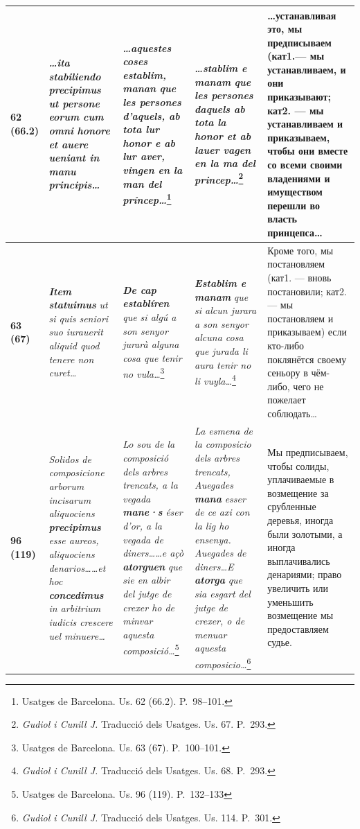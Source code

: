 \begin{center}
\begin{longtable}{|p{}|p{}|p{}|p{}|p{}|}
\textbf{62 (66.2)} & \emph{…ita }\textbf{\emph{stabiliendo precipimus}}\emph{ ut persone eorum cum omni }\emph{honore et auere ueniant in manu principis…} & \emph{…aquestes coses }\textbf{\emph{establim, manan}}\emph{ que les persones d’aquels, ab tota lur honor e ab lur aver, }\emph{vingen en la man del príncep…}\footnote{Usatges de Barcelona. Us. 62 (66.2). P.~98--101.} & \emph{…}\textbf{\emph{stablim e manam}}\emph{ que les persones daquels ab tota la honor et ab }\emph{lauer vagen en la ma del princep…}\footnote{\emph{Gudiol i Cunill J. }Traducció dels Usatges. Us. 67. P.~293.} & …\textbf{устанавливая }это, \textbf{мы предписываем}\textbf{ }(кат1.\textbf{--- }мы устанавливаем, и они приказывают; кат2. --- мы устанавливаем и приказываем, чтобы они вместе со всеми своими владениями и имуществом перешли во власть принцепса… \\ \hline
\textbf{63 (67)} & \textbf{\emph{Item statuimus}}\emph{ ut si quis seniori suo iurauerit aliquid quod tenere non curet…} & \textbf{\emph{De cap establíren}}\emph{ que si algú a son senyor jurarà alguna cosa que tenir no vula…}\footnote{Usatges de Barcelona. Us. 63 (67). P.~100--101.} & \textbf{\emph{Establim e manam}}\emph{ que si alcun jurara a son senyor alcuna cosa que jurada li aura tenir no li vuyla…}\footnote{\emph{Gudiol i Cunill J. }Traducció dels Usatges. Us. 68. P.~293.} & Кроме того, мы постановляем (кат1. --- вновь постановили; кат2. --- мы постановляем и приказываем) если кто-либо поклянётся своему сеньору в чём-либо, чего не пожелает соблюдать… \\ \hline
\textbf{96 (119)} & \emph{Solidos de composicione arborum incisarum aliquociens }\textbf{\emph{precipimus}}\emph{ esse aureos, aliquociens denarios……et hoc}\emph{ }\textbf{\emph{concedimus}}\emph{ in arbitrium iudicis crescere uel minuere…} & \emph{Lo sou de la composició dels arbres trencats, a la vegada }\textbf{\emph{mane·s}}\emph{ éser d’or, a la vegada de diners……e açò }\textbf{\emph{atorguen}}\emph{ que sie en albir del jutge de crexer ho de minvar aquesta composició…}\footnote{Usatges de Barcelona. Us. 96 (119). P.~132--133} & \emph{La esmena de la composicio dels arbres trencats, Auegades }\textbf{\emph{mana}}\emph{ esser de ce axi con la lig ho ensenya. Auegades de diners…E }\textbf{\emph{atorga}}\emph{ que sia esgart del jutge de crexer, o de menuar aquesta composicio…}\footnote{\emph{Gudiol i Cunill J. }Traducció dels Usatges. Us. 114. P.~301.} & Мы предписываем, чтобы солиды, уплачиваемые в возмещение за срубленные деревья, иногда были золотыми, а иногда выплачивались денариями; право увеличить или уменьшить возмещение мы предоставляем судье. \\ \hline
\end{longtable}
\end{center}

